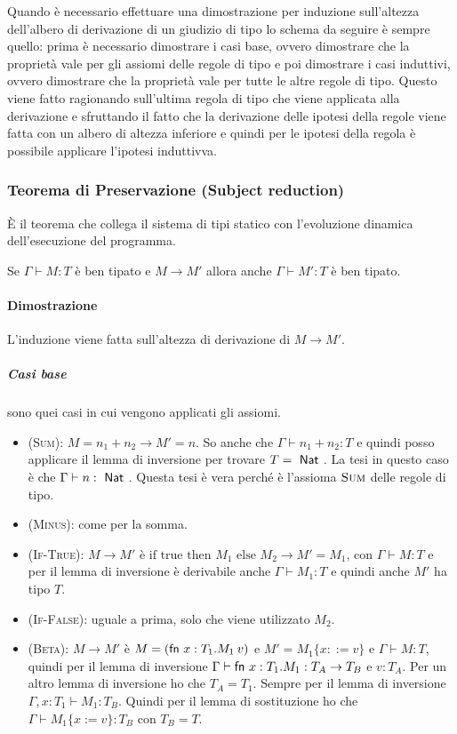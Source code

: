\noindent Quando è necessario effettuare una dimostrazione per induzione sull'altezza dell'albero di derivazione di un giudizio di tipo lo schema da seguire è sempre quello: prima è necessario dimostrare i casi base, ovvero dimostrare che la proprietà vale per gli assiomi delle regole di tipo e poi dimostrare i casi induttivi, ovvero dimostrare che la proprietà vale per tutte le altre regole di tipo. Questo viene fatto ragionando sull'ultima regola di tipo che viene applicata alla derivazione e sfruttando il fatto che la derivazione delle ipotesi della regole viene fatta con un albero di altezza inferiore e quindi per le ipotesi della regola è possibile applicare l'ipotesi induttivva.

\subsubsection{Teorema di Preservazione (Subject reduction)}

\`E il teorema che collega il sistema di tipi statico con l'evoluzione dinamica dell'esecuzione del programma.

\begin{center}
	Se $\Gamma \vdash M : T$ è ben tipato e $M \rightarrow M'$ allora anche $\Gamma \vdash M' : T$ è ben tipato.
\end{center}

\paragraph{Dimostrazione}

L'induzione viene fatta sull'altezza di derivazione di $M \rightarrow M'$.

\subparagraph{Casi base} sono quei casi in cui vengono applicati gli assiomi.

\begin{itemize}
	\item \textsc{(Sum)}: $M = n_1 + n_2 \rightarrow M' = n$. So anche che $\Gamma \vdash n_1 + n_2 : T$ e quindi posso applicare il lemma di inversione per trovare $ T= \Nat$. La tesi in questo caso è che $\Gamma \vdash n : \Nat$. Questa tesi è vera perché è l'assioma $\textsc{Sum}$ delle regole di tipo.
	\item \textsc{(Minus)}: come per la somma.
	\item \textsc{(If-True)}: $M \rightarrow M' $ è $\text{if true then }M_1 \text{ else }M_2 \rightarrow M' = M_1$, con $\Gamma \vdash M : T$ e per il lemma di inversione è derivabile anche $\Gamma \vdash M_1 : T$ e quindi anche $M'$ ha tipo $T$.
	\item \textsc{(If-False)}: uguale a prima, solo che viene utilizzato $M_2$.
	\item \textsc{(Beta)}: $M \rightarrow M'$ è $M = (\fn x:T_1 . M_1 \: v) $ e $M' = M_1\{x ::= v\}$ e $\Gamma \vdash M : T$, quindi per il lemma di inversione $\Gamma \vdash \fn x: T_1 . M_1 : T_A \rightarrow T_B$ e $v : T_A$. Per un altro lemma di inversione ho che $T_A = T_1$. Sempre per il lemma di inversione $\Gamma, x : T_1 \vdash M_1 : T_B$. Quindi per il lemma di sostituzione ho che $\Gamma \vdash M_1\{x := v\} : T_B$ con $T_B = T$.
\end{itemize}

